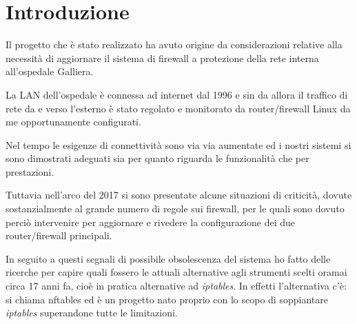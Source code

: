

\chapter{Introduzione} %

\label{Chapter1} %


\newcommand{\keyword}[1]{\textbf{#1}}
\newcommand{\tabhead}[1]{\textbf{#1}}
\newcommand{\code}[1]{\texttt{#1}}
\newcommand{\file}[1]{\texttt{\bfseries#1}}
\newcommand{\option}[1]{\texttt{\itshape#1}}


Il progetto che \`e stato realizzato ha avuto origine da considerazioni
relative alla necessit\`a di aggiornare il sistema di firewall a protezione
della rete interna all'ospedale Galliera.

La LAN dell'ospedale \`e connessa ad internet dal 1996 e sin da allora il
traffico di rete da e verso l'esterno \`e stato regolato e monitorato da
router/firewall Linux da me opportunamente configurati.

Nel tempo le esigenze di connettivit\`a sono via via aumentate ed i nostri
sistemi si sono dimostrati adeguati sia per quanto riguarda le funzionalit\`a
che per prestazioni.

Tuttavia nell'arco del 2017 si sono presentate alcune situazioni di
criticit\`a, dovute sostanzialmente al grande numero di regole sui firewall,
per le quali sono dovuto perci\`o intervenire per aggiornare e rivedere la
configurazione dei due router/firewall principali.

In seguito a questi segnali di possibile obsolescenza del sistema ho fatto delle
ricerche per capire quali fossero le attuali alternative agli strumenti scelti
oramai circa 17 anni fa, cio\`e in pratica alternative ad {\em iptables}.
In effetti l'alternativa c'\`e: si chiama nftables ed \`e un progetto nato
proprio con lo scopo di soppiantare {\em iptables} superandone tutte le limitazioni.

